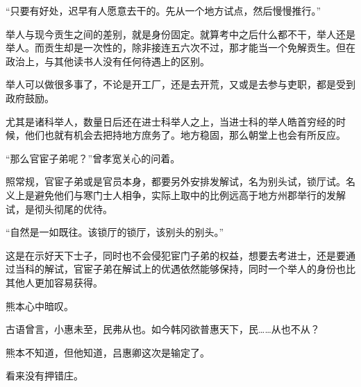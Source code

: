 “只要有好处，迟早有人愿意去干的。先从一个地方试点，然后慢慢推行。”

举人与现今贡生之间的差别，就是身份固定。就算考中之后什么都不干，举人还是举人。而贡生却是一次性的，除非接连五六次不过，那才能当一个免解贡生。但在政治上，与其他读书人没有任何待遇上的区别。

举人可以做很多事了，不论是开工厂，还是去开荒，又或是去参与吏职，都是受到政府鼓励。

尤其是诸科举人，数量日后还在进士科举人之上，当进士科的举人皓首穷经的时候，他们也就有机会去把持地方庶务了。地方稳固，那么朝堂上也会有所反应。

“那么官宦子弟呢？”曾孝宽关心的问着。

照常规，官宦子弟或是官员本身，都要另外安排发解试，名为别头试，锁厅试。名义上是避免他们与寒门士人相争，实际上取中的比例远高于地方州郡举行的发解试，是彻头彻尾的优待。

“自然是一如既往。该锁厅的锁厅，该别头的别头。”

这是在示好天下士子，同时也不会侵犯宦门子弟的权益，想要去考进士，还是要通过当科的解试，官宦子弟在解试上的优遇依然能够保持，同时一个举人的身份也比其他人更加容易获得。

熊本心中暗叹。

古语曾言，小惠未至，民弗从也。如今韩冈欲普惠天下，民……从也不从？

熊本不知道，但他知道，吕惠卿这次是输定了。

看来没有押错庄。
